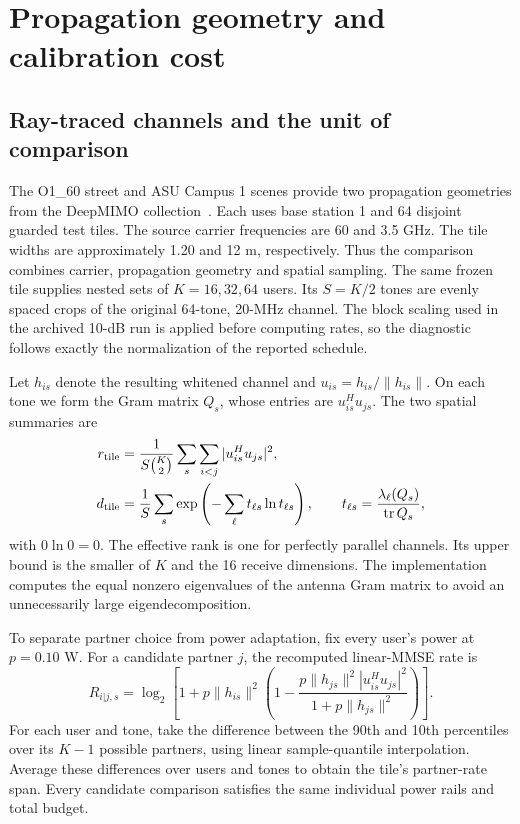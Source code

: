 \documentclass[10pt,letterpaper]{article}
\begin{document}
\FloatBarrier
\section{Propagation geometry and calibration cost}
\label{supp:note5}

\subsection*{Ray-traced channels and the unit of comparison}
The O1\_60 street and ASU Campus 1 scenes provide two propagation geometries from the DeepMIMO collection~\cite{deepmimo}. Each uses base station 1 and 64 disjoint guarded test tiles. The source carrier frequencies are 60 and 3.5 GHz. The tile widths are approximately 1.20 and 12 m, respectively. Thus the comparison combines carrier, propagation geometry and spatial sampling. The same frozen tile supplies nested sets of \(K=16,32,64\) users. Its \(S=K/2\) tones are evenly spaced crops of the original 64-tone, 20-MHz channel. The block scaling used in the archived 10-dB run is applied before computing rates, so the diagnostic follows exactly the normalization of the reported schedule.

Let \(h_{is}\) denote the resulting whitened channel and \(u_{is}=h_{is}/\|h_{is}\|\). On each tone we form the Gram matrix \(Q_s\), whose entries are \(u_{is}^{H}u_{js}\). The two spatial summaries are
\begin{align}
r_{\rm tile}&=\frac{1}{S{K\choose2}}\sum_s\sum_{i<j}|u_{is}^{H}u_{js}|^2,\\
d_{\rm tile}&=\frac1S\sum_s\exp\left(-\sum_\ell t_{\ell s}\ln t_{\ell s}\right),
\qquad t_{\ell s}=\frac{\lambda_\ell(Q_s)}{\operatorname{tr}Q_s},
\end{align}
with \(0\ln0=0\). The effective rank is one for perfectly parallel channels. Its upper bound is the smaller of \(K\) and the 16 receive dimensions. The implementation computes the equal nonzero eigenvalues of the antenna Gram matrix to avoid an unnecessarily large eigendecomposition.

To separate partner choice from power adaptation, fix every user's power at \(p=0.10\) W. For a candidate partner \(j\), the recomputed linear-MMSE rate is
\begin{equation}
R_{i|j,s}=\log_2\left[1+p\|h_{is}\|^2
\left(1-\frac{p\|h_{js}\|^2|u_{is}^{H}u_{js}|^2}
{1+p\|h_{js}\|^2}\right)\right].
\end{equation}
For each user and tone, take the difference between the 90th and 10th percentiles over its \(K-1\) possible partners, using linear sample-quantile interpolation. Average these differences over users and tones to obtain the tile's partner-rate span. Every candidate comparison satisfies the same individual power rails and total budget.
\end{document}
